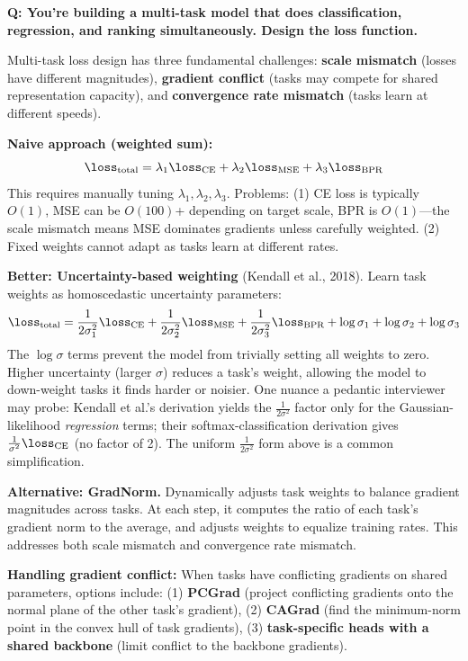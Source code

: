 \begin{interviewq}
\textbf{Q: You're building a multi-task model that does classification, regression, and ranking simultaneously. Design the loss function.}

 \quad {} \quad \badgefreq{\freqmed}

\stronganswer Multi-task loss design has three fundamental challenges: \textbf{scale mismatch} (losses have different magnitudes), \textbf{gradient conflict} (tasks may compete for shared representation capacity), and \textbf{convergence rate mismatch} (tasks learn at different speeds).

\textbf{Naive approach (weighted sum):}
$$\loss_{\text{total}} = \lambda_1 \loss_{\text{CE}} + \lambda_2 \loss_{\text{MSE}} + \lambda_3 \loss_{\text{BPR}}$$
This requires manually tuning $\lambda_1, \lambda_2, \lambda_3$. Problems: (1) CE loss is typically $O(1)$, MSE can be $O(100)$+ depending on target scale, BPR is $O(1)$---the scale mismatch means MSE dominates gradients unless carefully weighted. (2) Fixed weights cannot adapt as tasks learn at different rates.

\textbf{Better: Uncertainty-based weighting} (Kendall et al., 2018). Learn task weights as homoscedastic uncertainty parameters:
$$\loss_{\text{total}} = \frac{1}{2\sigma_1^2}\loss_{\text{CE}} + \frac{1}{2\sigma_2^2}\loss_{\text{MSE}} + \frac{1}{2\sigma_3^2}\loss_{\text{BPR}} + \log\sigma_1 + \log\sigma_2 + \log\sigma_3$$
The $\log\sigma$ terms prevent the model from trivially setting all weights to zero. Higher uncertainty (larger $\sigma$) reduces a task's weight, allowing the model to down-weight tasks it finds harder or noisier. One nuance a pedantic interviewer may probe: Kendall et al.'s derivation yields the $\frac{1}{2\sigma^2}$ factor only for the Gaussian-likelihood \textit{regression} terms; their softmax-classification derivation gives $\frac{1}{\sigma^2}\loss_{\text{CE}}$ (no factor of 2). The uniform $\frac{1}{2\sigma^2}$ form above is a common simplification.

\textbf{Alternative: GradNorm.} Dynamically adjusts task weights to balance gradient magnitudes across tasks. At each step, it computes the ratio of each task's gradient norm to the average, and adjusts weights to equalize training rates. This addresses both scale mismatch and convergence rate mismatch.

\textbf{Handling gradient conflict:} When tasks have conflicting gradients on shared parameters, options include: (1) \textbf{PCGrad} (project conflicting gradients onto the normal plane of the other task's gradient), (2) \textbf{CAGrad} (find the minimum-norm point in the convex hull of task gradients), (3) \textbf{task-specific heads with a shared backbone} (limit conflict to the backbone gradients).


\end{interviewq}
